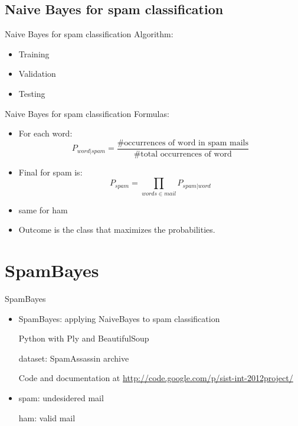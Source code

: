 \documentclass[xcolor=x11names,compress]{beamer}
\renewcommand{\(}{\begin{columns}}
\renewcommand{\)}{\end{columns}}
\newcommand{\<}[1]{\begin{column}{#1}}
\renewcommand{\>}{\end{column}}
\begin{document}
\subsection{Naive Bayes for spam classification}
\begin{frame}{Naive Bayes for spam classification}
Algorithm:
\begin{itemize}
    \item<1->Training
    \item<2->Validation
    \item<3->Testing
\end{itemize}
\end{frame}

\begin{frame}{Naive Bayes for spam classification}
Formulas:
\begin{itemize}
    \item<1->For each word: $$P_{word|spam} = \frac{\mbox{\# occurrences of word in spam mails}}{\mbox{\# total occurrences of word}}$$
    \item<2->Final for spam is: $$P_{spam} = \prod_{words \in mail} P_{spam|word}$$
    \item<3->same for ham
    \item<4->Outcome is the class that maximizes the probabilities.
\end{itemize}
\end{frame}

\section{SpamBayes}
\begin{frame}{SpamBayes}
  \begin{itemize}
    \item<1->SpamBayes: applying NaiveBayes to spam classification

    Python with Ply and BeautifulSoup
  
    dataset: SpamAssassin archive
    
    Code and documentation at \url{http://code.google.com/p/sist-int-2012project/}
    
    \item<2->spam: undesidered mail
    
    ham: valid mail
  \end{itemize}
\end{frame}
\end{document}
